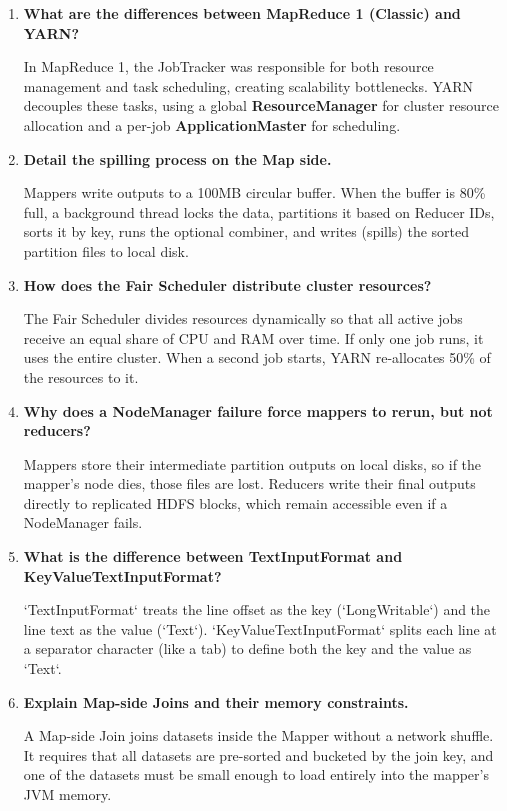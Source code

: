 \documentclass[12pt,a4paper]{article}
\newcommand{\Q}[1]{\textbf{#1}\par\noindent\ignorespaces}
\begin{document}
\vspace{6pt}

\begin{tcolorbox}[exambox, title={\textbf{Frequently Asked / Viva Questions}}]
\begin{enumerate}[leftmargin=*, topsep=0pt, label=\textbf{Q\arabic*.}, itemsep=5pt]
  \item \Q{What are the differences between MapReduce 1 (Classic) and YARN?}
        In MapReduce 1, the JobTracker was responsible for both resource management and task scheduling, creating scalability bottlenecks. YARN decouples these tasks, using a global \textbf{ResourceManager} for cluster resource allocation and a per-job \textbf{ApplicationMaster} for scheduling.
        
  \item \Q{Detail the spilling process on the Map side.}
        Mappers write outputs to a 100MB circular buffer. When the buffer is 80\% full, a background thread locks the data, partitions it based on Reducer IDs, sorts it by key, runs the optional combiner, and writes (spills) the sorted partition files to local disk.
        
  \item \Q{How does the Fair Scheduler distribute cluster resources?}
        The Fair Scheduler divides resources dynamically so that all active jobs receive an equal share of CPU and RAM over time. If only one job runs, it uses the entire cluster. When a second job starts, YARN re-allocates 50\% of the resources to it.
        
  \item \Q{Why does a NodeManager failure force mappers to rerun, but not reducers?}
        Mappers store their intermediate partition outputs on local disks, so if the mapper's node dies, those files are lost. Reducers write their final outputs directly to replicated HDFS blocks, which remain accessible even if a NodeManager fails.
        
  \item \Q{What is the difference between TextInputFormat and KeyValueTextInputFormat?}
        `TextInputFormat` treats the line offset as the key (`LongWritable`) and the line text as the value (`Text`). `KeyValueTextInputFormat` splits each line at a separator character (like a tab) to define both the key and the value as `Text`.
        
  \item \Q{Explain Map-side Joins and their memory constraints.}
        A Map-side Join joins datasets inside the Mapper without a network shuffle. It requires that all datasets are pre-sorted and bucketed by the join key, and one of the datasets must be small enough to load entirely into the mapper's JVM memory.
        

\end{enumerate}
\end{tcolorbox}
\end{document}
